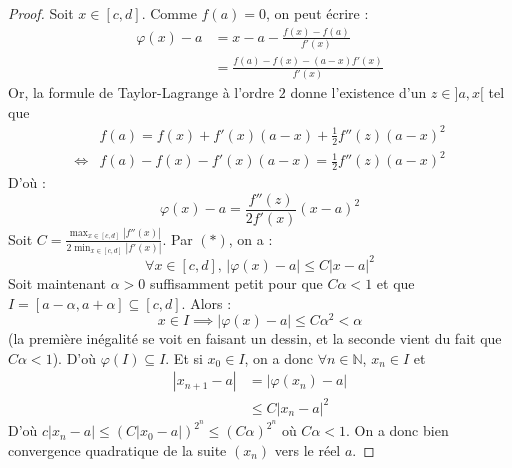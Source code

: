   \begin{proof}
    Soit $x \in [c, d]$. Comme $f(a) = 0$, on peut écrire :
    \begin{align*}
      \varphi(x) - a &= x - a - \frac{f(x) - f(a)}{f'(x)} \\
      &= \frac{f(a) - f(x) - (a-x)f'(x)}{f'(x)}
    \end{align*}
    Or, la formule de Taylor-Lagrange à l'ordre $2$ donne l'existence d'un $z \in ]a, x[$ tel que
    \begin{align*}
      &f(a) = f(x) + f'(x)(a-x) + \frac{1}{2} f''(z)(a-x)^2 \\
      \iff& f(a) - f(x) - f'(x)(a-x)  = \frac{1}{2} f''(z)(a-x)^2
    \end{align*}
    D'où :
    \[ \varphi(x) - a = \frac{f''(z)}{2f'(x)}(x-a)^2 \tag{$*$} \]
    Soit $C = \frac{\max_{x \in [c, d]} |f''(x)|}{2\min_{x \in [c, d]} |f'(x)|}$. Par $(*)$, on a :
    \[ \forall x \in [c, d], \, |\varphi(x)-a| \leq C |x-a|^2 \]
    Soit maintenant $\alpha > 0$ suffisamment petit pour que $C\alpha < 1$ et que $I = [a - \alpha, a + \alpha] \subseteq [c, d]$. Alors :
    \[ x \in I \implies |\varphi(x) - a| \leq C\alpha^2 < \alpha \]
    (la première inégalité se voit en faisant un dessin, et la seconde vient du fait que $C\alpha < 1$). D'où $\varphi(I) \subseteq I$. Et si $x_0 \in I$, on a donc $\forall n \in \mathbb{N}$, $x_n \in I$ et
    \begin{align*}
      |x_{n+1} - a| &= |\varphi(x_n) - a| \\
      &\leq C |x_n - a|^2
    \end{align*}
    D'où $c |x_n - a| \leq (C |x_0 - a|)^{2^n} \leq (C \alpha)^{2^n}$ où $C \alpha < 1$. On a donc bien convergence quadratique de la suite $(x_n)$ vers le réel $a$.
  \end{proof}


